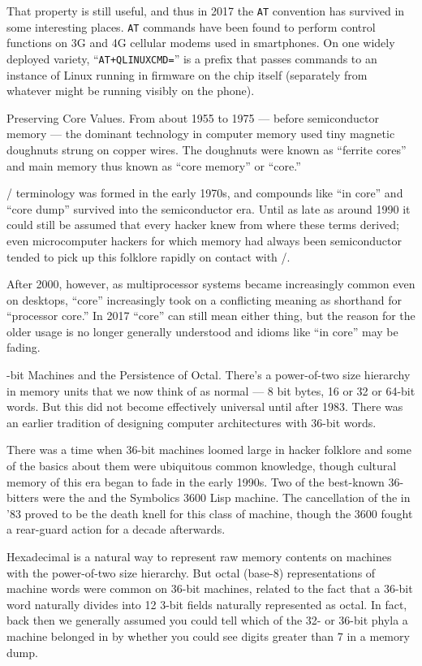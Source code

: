 That property is still useful, and thus in 2017 the {\tt AT} convention has survived
in some interesting places. {\tt AT} commands have been found to perform control
functions on 3G and 4G cellular modems used in smartphones. On one widely
deployed variety, ``{\tt AT+QLINUXCMD=}'' is a prefix that passes commands to an
instance of Linux running in firmware on the chip itself (separately from
whatever  might be running visibly on the phone).

\sect Preserving Core Values.
From about 1955 to 1975 --- before semiconductor memory --- the dominant technology
in computer memory used tiny magnetic doughnuts strung on copper wires. The
doughnuts were known as ``ferrite cores'' and main memory thus known as ``core
memory'' or ``core.''

\UNIX/ terminology was formed in the early 1970s, and compounds like ``in core''
and ``core dump'' survived into the semiconductor era. Until as late as around
1990 it could still be assumed that every hacker knew from where these terms
derived; even microcomputer hackers for which memory had always been
semiconductor  tended to pick up this folklore rapidly on contact with \UNIX/.

After 2000, however, as multiprocessor systems became increasingly common even
on desktops, ``core'' increasingly took on a conflicting meaning as shorthand for
``processor core.'' In 2017 ``core'' can still mean either thing, but the reason
for the older usage is no longer generally understood and idioms like ``in core''
may be fading.

-bit Machines and the Persistence of Octal.
There's a power-of-two size hierarchy in memory units that we now think of as
normal --- 8 bit bytes, 16 or 32 or 64-bit words. But this did not become
effectively universal until after 1983. There was an earlier tradition of
designing computer architectures with 36-bit words.

There was a time when 36-bit machines loomed large in hacker folklore and some
of the basics about them were ubiquitous common knowledge, though cultural
memory of this era began to fade in the early 1990s. Two of the best-known
36-bitters were the  and the Symbolics 3600 Lisp machine. The
cancellation of the  in '83 proved to be the death knell for this class
of machine, though the 3600 fought a rear-guard action for a decade afterwards.

Hexadecimal is a natural way to represent raw memory contents on machines with
the power-of-two size hierarchy. But octal (base-8) representations of machine
words were common on 36-bit machines, related to the fact that a 36-bit word
naturally divides into 12 3-bit fields naturally represented as octal. In fact,
back then we generally assumed you could tell which of the 32- or 36-bit phyla
a machine belonged in by whether you could see digits greater than 7 in a
memory dump.

